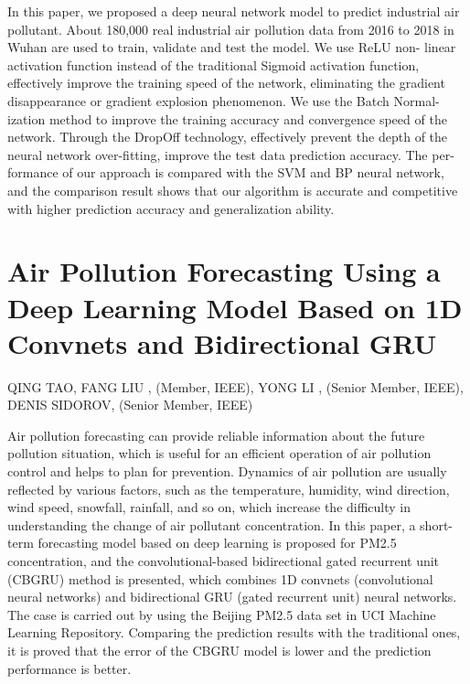 In this paper, we proposed a deep neural network model to predict industrial
air pollutant. About 180,000 real industrial air pollution data from 2016 to 2018
in Wuhan are used to train, validate and test the model. We use ReLU non-
linear activation function instead of the traditional Sigmoid activation function,
effectively improve the training speed of the network, eliminating the gradient
disappearance or gradient explosion phenomenon. We use the Batch Normal-
ization method to improve the training accuracy and convergence speed of the
network. Through the DropOff technology, effectively prevent the depth of the
neural network over-fitting, improve the test data prediction accuracy. The per-
formance of our approach is compared with the SVM and BP neural network,
and the comparison result shows that our algorithm is accurate and competitive
with higher prediction accuracy and generalization ability.

\section{Air Pollution Forecasting Using a Deep Learning
Model Based on 1D Convnets
and Bidirectional GRU}

QING TAO, FANG LIU , (Member, IEEE), YONG LI , (Senior Member, IEEE), DENIS SIDOROV, (Senior Member, IEEE)

Air pollution forecasting can provide reliable information about the future pollution situation,
which is useful for an efficient operation of air pollution control and helps to plan for prevention. Dynamics
of air pollution are usually reflected by various factors, such as the temperature, humidity, wind direction,
wind speed, snowfall, rainfall, and so on, which increase the difficulty in understanding the change of air
pollutant concentration. In this paper, a short-term forecasting model based on deep learning is proposed for
PM2.5 concentration, and the
convolutional-based bidirectional gated recurrent unit (CBGRU) method is presented, which combines 1D
convnets (convolutional neural networks) and bidirectional GRU (gated recurrent unit) neural networks. The
case is carried out by using the Beijing PM2.5 data set in UCI Machine Learning Repository. Comparing the
prediction results with the traditional ones, it is proved that the error of the CBGRU model is lower and the
prediction performance is better.


